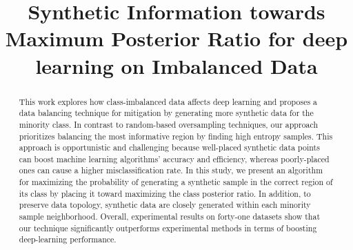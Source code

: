 \documentclass[journal]{IEEEtai}
\newcommand{\MethodnameLong}{Synthetic Information towards Maximum Posterior Ratio}
\begin{document}
\title{\MethodnameLong{} for deep learning on Imbalanced Data\\}

\author{
	}


\maketitle
\thispagestyle{plain}
\pagestyle{plain}

\begin{abstract}

	This work explores how class-imbalanced data affects deep learning and proposes a data balancing technique for mitigation by generating more synthetic data for the minority class. In contrast to random-based oversampling techniques, our approach prioritizes balancing the most informative region by finding high entropy samples. This approach is opportunistic and challenging because well-placed synthetic data points can boost machine learning algorithms' accuracy and efficiency, whereas poorly-placed ones can cause a higher misclassification rate. In this study, we present an algorithm for maximizing the probability of generating a synthetic sample in the correct region of its class by placing it toward maximizing the class posterior ratio. In addition, to preserve data topology, synthetic data are closely generated within each minority sample neighborhood. Overall, experimental results on forty-one datasets show that our technique significantly outperforms experimental methods in terms of boosting deep-learning performance. 
\end{abstract}
\end{document}
